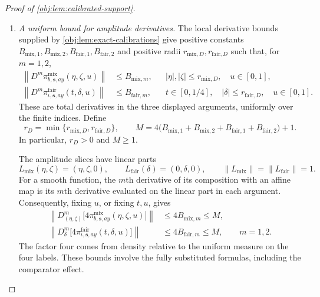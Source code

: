 \documentclass[11pt]{article}
\begin{document}
\begin{proof}[Proof of \cref{obj:lem:calibrated-support}]
\begin{enumerate}
\item \textit{A uniform bound for amplitude derivatives.}
The local derivative bounds supplied by
\cref{obj:lem:exact-calibrations} give positive constants
\(B_{\mathrm{mix},1},B_{\mathrm{mix},2},
 B_{\mathrm{fair},1},B_{\mathrm{fair},2}\)
and positive radii \(r_{\mathrm{mix},D},r_{\mathrm{fair},D}\) such that, for \(m=1,2\),
\[
\begin{aligned}
\left\|D^m\pi^{\mathrm{mix}}_{b,\mathbf s,ay}
                   (\eta,\zeta,u)\right\|
&\le B_{\mathrm{mix},m},
&&|\eta|,|\zeta|\le r_{\mathrm{mix},D},\quad u\in[0,1],\\
\left\|D^m\pi^{\mathrm{fair}}_{\iota,\mathbf s,ay}
                   (t,\delta,u)\right\|
&\le B_{\mathrm{fair},m},
&&t\in[0,1/4],\quad |\delta|\le r_{\mathrm{fair},D},
  \quad u\in[0,1].
\end{aligned}
\]
These are total derivatives in the three displayed arguments, uniformly over the finite indices. Define
\[
r_D=\min\{r_{\mathrm{mix},D},r_{\mathrm{fair},D}\},
\qquad
M=4\bigl(B_{\mathrm{mix},1}+B_{\mathrm{mix},2}
        +B_{\mathrm{fair},1}+B_{\mathrm{fair},2}\bigr)+1.
\]
In particular, \(r_D>0\) and \(M\ge1\).

The amplitude slices have linear parts
\[
L_{\mathrm{mix}}(\eta,\zeta)=(\eta,\zeta,0),
\qquad
L_{\mathrm{fair}}(\delta)=(0,\delta,0),
\qquad
\|L_{\mathrm{mix}}\|=\|L_{\mathrm{fair}}\|=1.
\]
For a smooth function, the \(m\)th derivative of its composition with an affine map is its \(m\)th derivative evaluated on the linear part in each argument. Consequently, fixing \(u\), or fixing \(t,u\), gives
\[
\begin{aligned}
\left\|D^m_{(\eta,\zeta)}
      \bigl[4\pi^{\mathrm{mix}}_{b,\mathbf s,ay}(\eta,\zeta,u)\bigr]\right\|
&\le4B_{\mathrm{mix},m}\le M,\\
\left\|D^m_\delta
      \bigl[4\pi^{\mathrm{fair}}_{\iota,\mathbf s,ay}(t,\delta,u)\bigr]\right\|
&\le4B_{\mathrm{fair},m}\le M,
\qquad m=1,2.
\end{aligned}
\]
The factor four comes from density relative to the uniform measure on the four labels. These bounds involve the fully substituted formulas, including the comparator effect.


\end{enumerate}
\end{proof}
\end{document}
